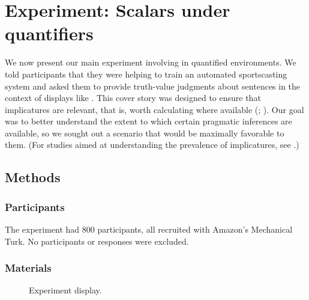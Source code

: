 \documentclass[leqno,12pt]{article}
\begin{document}

\section{Experiment: Scalars under quantifiers}\label{sec:binary}

We now present our main experiment involving  in quantified
environments. We told participants that they were helping to train an
automated sportscasting system and asked them to provide truth-value
judgments about sentences in the context of displays like
. This cover story was designed to ensure
that implicatures are relevant, that is, worth calculating where
available (;
\citealt{Clifton:Dube:2010}). Our goal was to better understand the
extent to which certain pragmatic inferences are available, so we
sought out a scenario that would be maximally favorable to them. (For
studies aimed at understanding the prevalence of implicatures, see
\citealt{Paris:1973,Hendriks-etal:2009,Degen:2015}.)


\subsection{Methods}

\subsubsection{Participants}

The experiment had 800 participants, all recruited with Amazon's
Mechanical Turk. No participants or responses were excluded.

\subsubsection{Materials}

\begin{figure}[t]
  \centering
  \caption{Experiment display.}
  \label{fig:binary:materials}
\end{figure}
\end{document}
